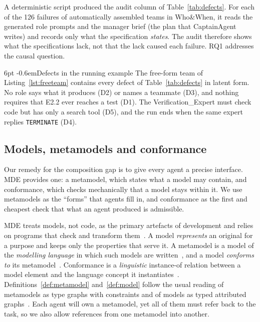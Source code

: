 \documentclass[pdflatex,sn-mathphys-num]{sn-jnl}
\makeatletter
\theoremstyle{thmstyleone}%
\theoremstyle{thmstyletwo}%
\theoremstyle{thmstylethree}%
\newcommand{\D}[1]{\textsf{D#1}}
\newcommand{\code}[1]{\texttt{#1}}
\renewcommand\paragraph{\@startsection{paragraph}{4}{\z@}%
  {6pt \@plus 2pt \@minus 1pt}{-0.6em}{\normalfont\normalsize\bfseries}}
\makeatother
\begin{document}
A deterministic script produced the audit column of Table~\ref{tab:defects}.
For each of the 126 failures of automatically assembled teams in Who\&When, it
reads the generated role prompts and the manager brief (the plan that
CaptainAgent writes) and records only what the specification \emph{states}. The
audit therefore shows what the specifications lack, not that the lack caused
each failure. RQ1 addresses the causal question.

\paragraph{Defects in the running example} The free-form team of
Listing~\ref{lst:freeteam} contains every defect of Table~\ref{tab:defects} in
latent form. No role says what it produces (\D{2}) or names a teammate
(\D{3}), and nothing requires that E2.2 ever reaches a test (\D{1}). The
Verification\_Expert must check code but has only a search tool (\D{5}), and
the run ends when the same expert replies \code{TERMINATE} (\D{4}).

\subsection{Models, metamodels and conformance}\label{sec:bg-models}

Our remedy for the composition gap is to give every agent a precise interface.
MDE provides one: a metamodel, which states what a model may contain, and
conformance, which checks mechanically that a model stays within it. We use
metamodels as the ``forms'' that agents fill in, and conformance as the first
and cheapest check that what an agent produced is admissible.

MDE treats models, not code, as the primary artefacts of development and
relies on programs that check and transform
them~\cite{schmidt2006mde,brambilla2017mdse,naveed2024mde4ml}. A model
\emph{represents} an original for a purpose and keeps only the properties that
serve it. A metamodel is a model of the \emph{modelling language} in which such
models are written~\cite{kuhne2006matters}, and a model \emph{conforms to} its
metamodel~\cite{bezivin2005unification}. Conformance is a \emph{linguistic}
instance-of relation between a model element and the language concept it
instantiates~\cite{kuhne2006matters,atkinson2003foundation}.
Definitions~\ref{def:metamodel} and~\ref{def:model} follow the usual reading of
metamodels as type graphs with constraints and of models as typed attributed
graphs~\cite{ehrig2006fundamentals}. Each agent will own a metamodel, yet all
of them must refer back to the task, so we also allow references from one
metamodel into another.
\end{document}
